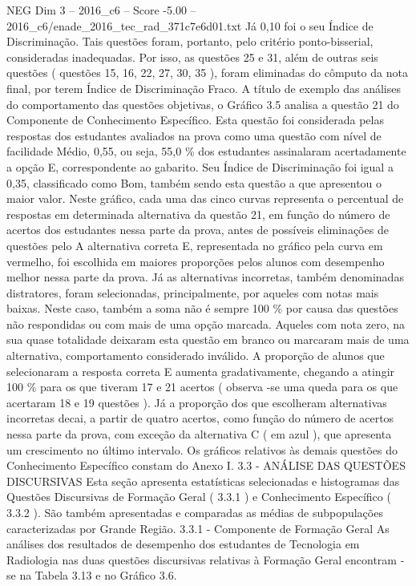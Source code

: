 \begin{textsample}{NEG Dim 3 – 2016\_c6 – Score -5.00 – 2016\_c6/enade\_2016\_tec\_rad\_371c7e6d01.txt}
Já 0,10 foi o seu Índice de Discriminação.
Tais questões foram, portanto, pelo critério ponto-bisserial, consideradas inadequadas.
Por isso, as questões 25 e 31, além de outras seis questões ( questões 15, 16, 22, 27, 30, 35 ), foram eliminadas do cômputo da nota final, por terem Índice de Discriminação Fraco.
A título de exemplo das análises do comportamento das questões objetivas, o Gráfico 3.5 analisa a questão 21 do Componente de Conhecimento Específico.
Esta questão foi considerada pelas respostas dos estudantes avaliados na prova como uma questão com nível de facilidade Médio, 0,55, ou seja, 55,0 \% dos estudantes assinalaram acertadamente a opção E, correspondente ao gabarito.
Seu Índice de Discriminação foi igual a 0,35, classificado como Bom, também sendo esta questão a que apresentou o maior valor.
Neste gráfico, cada uma das cinco curvas representa o percentual de respostas em determinada alternativa da questão 21, em função do número de acertos dos estudantes nessa parte da prova, antes de possíveis eliminações de questões pelo A alternativa correta E, representada no gráfico pela curva em vermelho, foi escolhida em maiores proporções pelos alunos com desempenho melhor nessa parte da prova.
Já as alternativas incorretas, também denominadas distratores, foram selecionadas, principalmente, por aqueles com notas mais baixas.
Neste caso, também a soma não é sempre 100 \% por causa das questões não respondidas ou com mais de uma opção marcada.
Aqueles com nota zero, na sua quase totalidade deixaram esta questão em branco ou marcaram mais de uma alternativa, comportamento considerado inválido.
A proporção de alunos que selecionaram a resposta correta E aumenta gradativamente, chegando a atingir 100 \% para os que tiveram 17 e 21 acertos ( observa -se uma queda para os que acertaram 18 e 19 questões ).
Já a proporção dos que escolheram alternativas incorretas decai, a partir de quatro acertos, como função do número de acertos nessa parte da prova, com exceção da alternativa C ( em azul ), que apresenta um crescimento no último intervalo.
Os gráficos relativos às demais questões do Conhecimento Específico constam do Anexo I. 3.3 - ANÁLISE DAS QUESTÕES DISCURSIVAS Esta seção apresenta estatísticas selecionadas e histogramas das Questões Discursivas de Formação Geral ( 3.3.1 ) e Conhecimento Específico ( 3.3.2 ).
São também apresentadas e comparadas as médias de subpopulações caracterizadas por Grande Região. 3.3.1 - Componente de Formação Geral As análises dos resultados de desempenho dos estudantes de Tecnologia em Radiologia nas duas questões discursivas relativas à Formação Geral encontram -se na Tabela 3.13 e no Gráfico 3.6.

\end{textsample}
